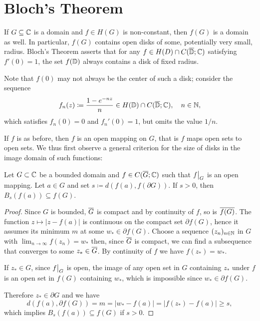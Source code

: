 \section{Bloch's Theorem}
\label{sec:blochs-theorem}

If $G \subseteq \mathbb{C}$ is a domain and $f \in H(G)$ is non-constant, then $f(G)$ is a domain as well. In particular, $f(G)$ contains open disks of some, potentially very small, radius. Bloch's Theorem asserts that for any $f \in H(D) \cap C(\overline{\mathbb{D}}; \mathbb{C})$ satisfying $f'(0) = 1$, the set $f(\mathbb{D})$ always contains a disk of fixed radius.

Note that $f(0)$ may not always be the center of such a disk; consider the sequence
\begin{equation*}
    f_n(z) \coloneqq \frac{1 - e^{- n z}}{n} \in H(\mathbb{D}) \cap C(\overline{\mathbb{D}}; \mathbb{C}), \quad n \in \mathbb{N},
\end{equation*}
which satisfies $f_n(0) = 0$ and $f_n'(0) = 1$, but omits the value $1 / n$.

If $f$ is as before, then $f$ is an open mapping on $G$, that is $f$ maps open sets to open sets. We thus first observe a general criterion for the size of disks in the image domain of such functions:

\begin{lemma} \label{lem:bloch-lemma-1}
    Let $G \subset \mathbb{C}$ be a bounded domain and $f \in C(\overline{G}; \mathbb{C})$ such that $\restr{f}{G}$ is an open mapping. Let $a \in G$ and set $s \coloneqq d(f(a), f(\partial G))$. If $s > 0$, then $B_{s}(f(a)) \subseteq f(G)$.
\end{lemma}

\begin{proof}
    Since $G$ is bounded, $\overline{G}$ is compact and by continuity of $f$, so is $\overline{f(G)}$.
    The function $z \mapsto \vert z - f(a) \vert$ is continuous on the compact set $\partial f(G)$, hence it assumes its minimum $m$ at some $w_* \in \partial f(G)$. Choose a sequence $(z_n)_{n \in \mathbb{N}}$ in $G$ with $\lim_{n \to \infty} f(z_n) = w_*$ then, since $\overline{G}$ is compact, we can find a subsequence that converges to some $z_* \in \overline{G}$. By continuity of $f$ we have $f(z_*) = w_*$.

    If $z_* \in G$, since $\restr{f}{G}$ is open, the image of any open set in $G$ containing $z_*$ under $f$ is an open set in $f(G)$ containing $w_*$, which is impossible since $w_* \in \partial f(G)$.

    Therefore $z_* \in \partial G$ and we have
    $$ d(f(a), \partial f(G)) = m = \vert w_* - f(a) \vert = \vert f(z_*) - f(a) \vert \geq s, $$
    which implies $B_{s}(f(a)) \subseteq f(G)$ if $s > 0$.
\end{proof}

